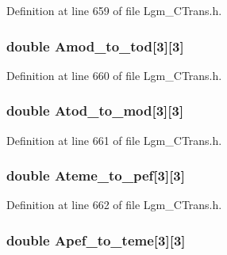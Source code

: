 Definition at line 659 of file Lgm\_\-CTrans.h.\hypertarget{struct_lgm___c_trans_0e3054fe310e108d1ba7eb105157bfe4}{
\subsubsection[{Amod\_\-to\_\-tod}]{\setlength{\rightskip}{0pt plus 5cm}double {\bf Amod\_\-to\_\-tod}\mbox{[}3\mbox{]}\mbox{[}3\mbox{]}}}
\label{struct_lgm___c_trans_0e3054fe310e108d1ba7eb105157bfe4}




Definition at line 660 of file Lgm\_\-CTrans.h.\hypertarget{struct_lgm___c_trans_cc69117b82eb049717039242959205ec}{
\subsubsection[{Atod\_\-to\_\-mod}]{\setlength{\rightskip}{0pt plus 5cm}double {\bf Atod\_\-to\_\-mod}\mbox{[}3\mbox{]}\mbox{[}3\mbox{]}}}
\label{struct_lgm___c_trans_cc69117b82eb049717039242959205ec}




Definition at line 661 of file Lgm\_\-CTrans.h.\hypertarget{struct_lgm___c_trans_8d8bb9c7bf109ce43279c3cc26cf0c1c}{
\subsubsection[{Ateme\_\-to\_\-pef}]{\setlength{\rightskip}{0pt plus 5cm}double {\bf Ateme\_\-to\_\-pef}\mbox{[}3\mbox{]}\mbox{[}3\mbox{]}}}
\label{struct_lgm___c_trans_8d8bb9c7bf109ce43279c3cc26cf0c1c}




Definition at line 662 of file Lgm\_\-CTrans.h.\hypertarget{struct_lgm___c_trans_9949aa9d5838e2e3a6b46c94d772dd59}{
\subsubsection[{Apef\_\-to\_\-teme}]{\setlength{\rightskip}{0pt plus 5cm}double {\bf Apef\_\-to\_\-teme}\mbox{[}3\mbox{]}\mbox{[}3\mbox{]}}}
\label{struct_lgm___c_trans_9949aa9d5838e2e3a6b46c94d772dd59}




